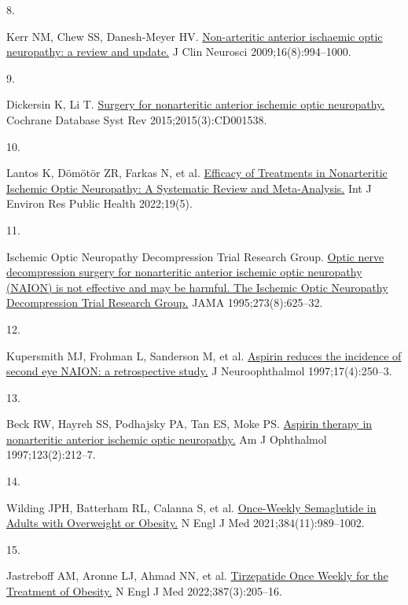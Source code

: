 \documentclass[
  11pt,
]{article}
\newlength{\cslhangindent}
\newlength{\csllabelwidth}
\newenvironment{CSLReferences}[2] %
 {\begin{list}{}{%
  \setlength{\itemindent}{0pt}
  \setlength{\leftmargin}{0pt}
  \setlength{\parsep}{0pt}
  \ifodd #1
   \setlength{\leftmargin}{\cslhangindent}
   \setlength{\itemindent}{-1\cslhangindent}
  \fi
  \setlength{\itemsep}{#2\baselineskip}}}
 {\end{list}}
\newcommand{\CSLLeftMargin}[1]{\parbox[t]{\csllabelwidth}{\strut#1\strut}}
\newcommand{\CSLRightInline}[1]{\parbox[t]{\linewidth - \csllabelwidth}{\strut#1\strut}}
\begin{document}
\begin{CSLReferences}{0}{1}
\CSLLeftMargin{8. }%
\CSLRightInline{Kerr NM, Chew SS, Danesh-Meyer HV.
\href{https://doi.org/10.1016/j.jocn.2009.04.002}{{Non-arteritic
anterior ischaemic optic neuropathy: a review and update.}} J Clin
Neurosci 2009;16(8):994--1000. }

\CSLLeftMargin{9. }%
\CSLRightInline{Dickersin K, Li T.
\href{https://doi.org/10.1002/14651858.CD001538.pub4}{{Surgery for
nonarteritic anterior ischemic optic neuropathy.}} Cochrane Database
Syst Rev 2015;2015(3):CD001538. }

\CSLLeftMargin{10. }%
\CSLRightInline{Lantos K, Dömötör ZR, Farkas N, et al.
\href{https://doi.org/10.3390/ijerph19052718}{{Efficacy of Treatments in
Nonarteritic Ischemic Optic Neuropathy: A Systematic Review and
Meta-Analysis.}} Int J Environ Res Public Health 2022;19(5). }

\CSLLeftMargin{11. }%
\CSLRightInline{Ischemic Optic Neuropathy Decompression Trial Research
Group. \href{}{{Optic nerve decompression surgery for nonarteritic
anterior ischemic optic neuropathy (NAION) is not effective and may be
harmful. The Ischemic Optic Neuropathy Decompression Trial Research
Group.}} JAMA 1995;273(8):625--32. }

\CSLLeftMargin{12. }%
\CSLRightInline{Kupersmith MJ, Frohman L, Sanderson M, et al.
\href{}{{Aspirin reduces the incidence of second eye NAION: a
retrospective study.}} J Neuroophthalmol 1997;17(4):250--3. }

\CSLLeftMargin{13. }%
\CSLRightInline{Beck RW, Hayreh SS, Podhajsky PA, Tan ES, Moke PS.
\href{https://doi.org/10.1016/s0002-9394(14)71038-4}{{Aspirin therapy in
nonarteritic anterior ischemic optic neuropathy.}} Am J Ophthalmol
1997;123(2):212--7. }

\CSLLeftMargin{14. }%
\CSLRightInline{Wilding JPH, Batterham RL, Calanna S, et al.
\href{https://doi.org/10.1056/NEJMoa2032183}{{Once-Weekly Semaglutide in
Adults with Overweight or Obesity.}} N Engl J Med
2021;384(11):989--1002. }

\CSLLeftMargin{15. }%
\CSLRightInline{Jastreboff AM, Aronne LJ, Ahmad NN, et al.
\href{https://doi.org/10.1056/NEJMoa2206038}{{Tirzepatide Once Weekly
for the Treatment of Obesity.}} N Engl J Med 2022;387(3):205--16. }


\end{CSLReferences}
\end{document}

